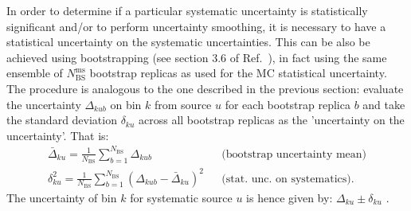 In order to determine if a particular systematic uncertainty is statistically significant and/or to perform uncertainty smoothing, it is necessary to have a statistical uncertainty on the systematic uncertainties. This can be also be achieved using bootstrapping (see section 3.6 of Ref.~\cite{ATLAS-bootstrap}), in fact using the same ensemble of $N_\mathrm{BS}^\mathrm{ms}$ bootstrap replicas as used for the MC statistical uncertainty. The procedure is analogous to the one described in the previous section: evaluate the uncertainty $\Delta_{kub}$ on bin $k$ from source $u$ for each bootstrap replica $b$ and take the standard deviation $\delta_{ku}$ across all bootstrap replicas as the 'uncertainty on the uncertainty'. That is:
\begin{eqnarray}
  \label{eq:unc-on-unc}
  \bar{\Delta}_{ku} = \frac{1}{N_\mathrm{BS}}\sum_{b=1}^{N_\mathrm{BS}} \Delta_{kub} 
  & & \text{(bootstrap uncertainty mean)}\\
  \delta_{ku}^2 = \frac{1}{N_\mathrm{BS}}\sum_{b=1}^{N_\mathrm{BS}} \left(\Delta_{kub} - \bar{\Delta}_{ku}\right)^2 
  & & \text{(stat.~unc.~on systematics)}.
\end{eqnarray}
The uncertainty of bin $k$ for systematic source $u$ is hence given by: $\Delta_{ku} \pm \delta_{ku}$ .
